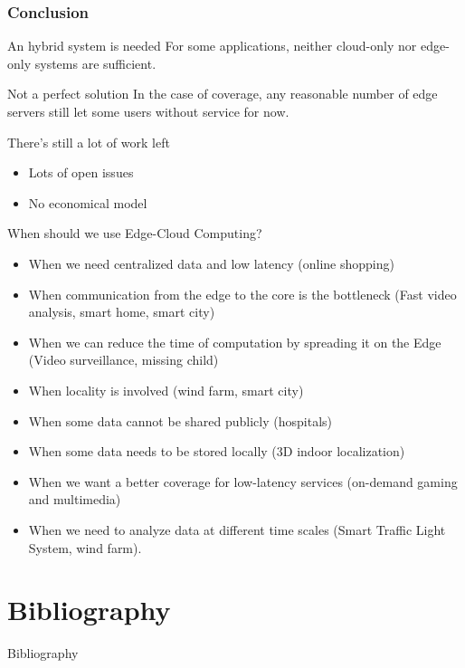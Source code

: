 \documentclass[utf8,xcolor=table, page number]{earlywinter}
\begin{document}
\begin{frame}
  \frametitle{Conclusion}

  \begin{block}{An hybrid system is needed}
    For some applications, neither cloud-only nor edge-only systems are sufficient.
  \end{block}
  
  \begin{alertblock}{Not a perfect solution}
    In the case of coverage, any reasonable number of edge servers still let some users without service for now.
  \end{alertblock}
  
  \begin{alertblock}{There's still a lot of work left}
    \begin{itemize}
      \item Lots of open issues
      \item No economical model
    \end{itemize}
  \end{alertblock}

  
\end{frame}


\begin{frame}{When should we use Edge-Cloud Computing?}
\begin{itemize}
\item When we need centralized data and low latency (online shopping)
\item When communication from the edge to the core is the bottleneck (Fast video analysis, smart home, smart city)
\item When we can reduce the time of computation by spreading it on the Edge (Video surveillance, missing child)
\item When locality is involved (wind farm, smart city)
\item When some data cannot be shared publicly (hospitals)
\item When some data needs to be stored locally (3D indoor localization)
\item When we want a better coverage for low-latency services (on-demand gaming and multimedia)
\item When we need to analyze data at different time scales (Smart Traffic Light System, wind farm). 
\end{itemize}
\end{frame}


\section{Bibliography}
\begin{frame}{Bibliography}
  \tiny
  \nocite{*}
  
  
\end{frame}
\end{document}
